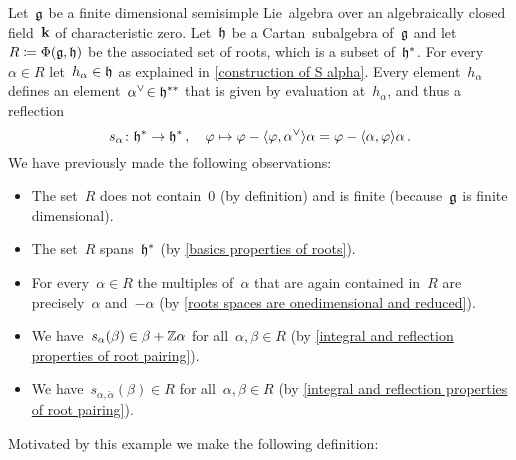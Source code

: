 \begin{example}[Motivation]
  Let~$\mathfrak{g}$ be a finite dimensional semisimple Lie~algebra over an algebraically closed field~$\mathbf{k}$ of characteristic zero.
  Let~$\mathfrak{h}$ be a Cartan~subalgebra of~$\mathfrak{g}$ and let~$R \coloneqq \Phi(\mathfrak{g}, \mathfrak{h})$ be the associated set of roots, which is a subset of~$\mathfrak{h}^*$.
  For every~$\alpha \in R$ let~$h_\alpha \in \mathfrak{h}$ as explained in \cref{construction of S alpha}.
  Every element~$h_\alpha$ defines an element~$\check*{\alpha} \in \hlie^{**}$ that is given by evaluation at~$h_\alpha$, and thus a reflection
  \[
    s_\alpha
    \colon
    \hlie^*
    \to
    \hlie^* \,,
    \quad
    \varphi
    \mapsto
    \varphi - \pair{\varphi, \check{\alpha}} \alpha
    =
    \varphi - \pair{\alpha, \varphi} \alpha \,.
  \]
  We have previously made the following observations:
  \begin{itemize}
    \item
      The set~$R$ does not contain~$0$ (by definition) and is finite (because~$\mathfrak{g}$ is finite dimensional).
    \item
      The set~$R$ spans~$\mathfrak{h}^*$ (by \cref{basics properties of roots}).
    \item
      For every~$\alpha \in R$ the multiples of~$\alpha$ that are again contained in~$R$ are precisely~$\alpha$ and~$-\alpha$ (by \cref{roots spaces are onedimensional and reduced}).
    \item
      We have~$s_\alpha(\beta) \in \beta + \mathbb{Z} \alpha$ for all~$\alpha, \beta \in R$ (by \cref{integral and reflection properties of root pairing}).
    \item
      We have~$s_{\alpha, \check{\alpha}}(\beta) \in R$ for all~$\alpha, \beta \in R$ (by \cref{integral and reflection properties of root pairing}).
  \end{itemize}
  Motivated by this example we make the following definition:
\end{example}


